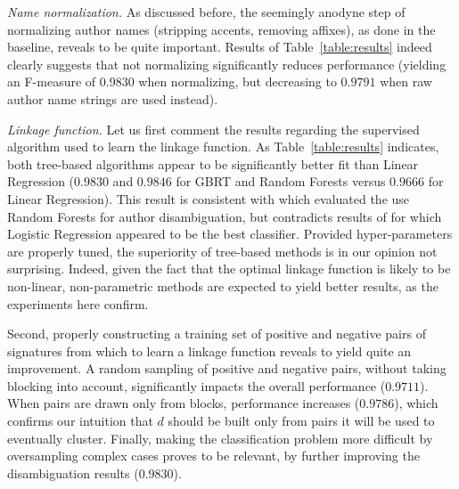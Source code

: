 \documentclass{article}
\begin{document}
\textit{Name normalization.} As discussed before, the seemingly anodyne step of
normalizing author names (stripping accents, removing affixes), as done in the
baseline, reveals to be quite important. Results of Table~\ref{table:results}
indeed clearly suggests that not normalizing significantly reduces performance
(yielding an F-measure of $0.9830$ when normalizing, but decreasing to $0.9791$
when raw author name strings are used instead).

\textit{Linkage function.} Let us first comment the results regarding the
supervised algorithm used to learn the linkage function. As
Table~\ref{table:results} indicates, both tree-based algorithms appear to be
significantly better fit than Linear Regression ($0.9830$ and $0.9846$ for GBRT
and Random Forests versus $0.9666$ for Linear Regression). This result is
consistent with \citep{treeratpituk2009disambiguating} which evaluated the use
Random Forests for author disambiguation, but contradicts results of
\citep{levin2012citation} for which Logistic Regression appeared to be the best
classifier. Provided hyper-parameters are properly tuned, the superiority of
tree-based methods is in our opinion not surprising. Indeed, given the fact
that the optimal linkage function is likely to be non-linear, non-parametric
methods are expected to yield better results, as the experiments here confirm.

Second, properly constructing a training set of positive and negative pairs of
signatures from which to learn a linkage function reveals to yield quite an
improvement. A random sampling of positive and negative pairs, without taking
blocking into account, significantly impacts the overall performance
($0.9711$). When pairs are drawn only from blocks, performance increases
($0.9786$), which confirms our intuition that $d$ should be built only from
pairs it will be used to eventually cluster. Finally, making the classification
problem more difficult by oversampling complex cases proves to be relevant,
by further improving the disambiguation results ($0.9830$).
\end{document}
